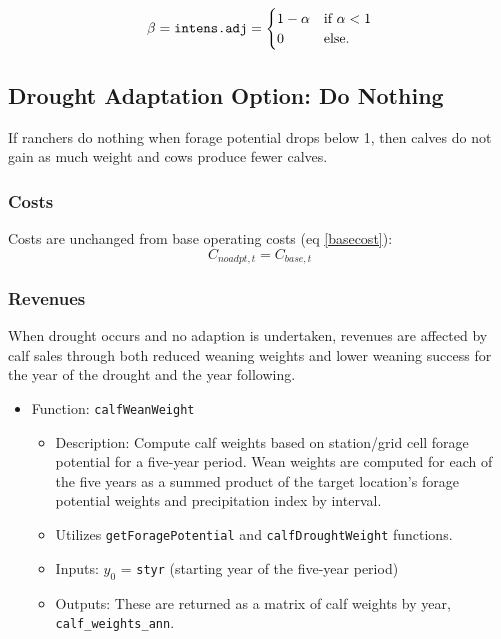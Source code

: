 \documentclass[11pt]{article}
\begin{document}
\begin{equation} \label{intens}
\beta = \verb!intens.adj!=
\begin{cases}
1-\alpha & \text{if}\ \alpha < 1 \\
0 & \text{else}.
\end{cases}
\end{equation}


\subsection{Drought Adaptation Option: Do Nothing}
If ranchers do nothing when forage potential drops below 1, then calves do not gain as much weight and cows produce fewer calves. 

\subsubsection{Costs}
Costs are unchanged from base operating costs (eq \ref{basecost}):
\begin{equation}
C_{noadpt,t} = C_{base,t}
\end{equation}


\subsubsection{Revenues}
When drought occurs and no adaption is undertaken, revenues are affected by calf sales through both reduced weaning weights and lower weaning success for the year of the drought and the year following.

\begin{itemize}
\item Function: \verb!calfWeanWeight!
	\begin{itemize}
	\item Description: Compute calf weights based on station/grid cell forage potential for a five-year period. Wean weights are computed for each of the five years as a summed product of the target location's forage potential weights and precipitation index by interval. 
	\item Utilizes \verb!getForagePotential! and \verb!calfDroughtWeight! functions.
	\item Inputs: $y_0$ = \verb!styr! (starting year of the five-year period)
	\item Outputs: These are returned as a matrix of calf weights by year, \verb!calf_weights_ann!.
	\end{itemize}
\end{itemize}
\end{document}
